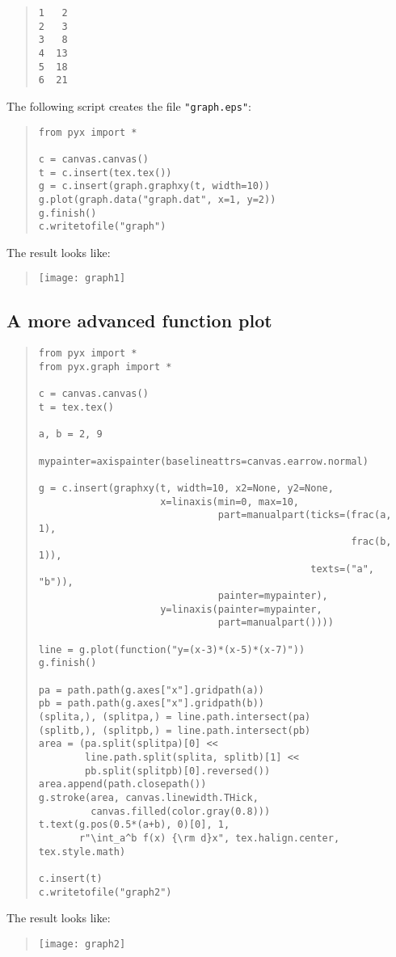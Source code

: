 \begin{quote}
\begin{verbatim}
1   2
2   3
3   8
4  13
5  18
6  21
\end{verbatim}
\end{quote}

The following script creates the file \verb|"graph.eps"|:

\begin{quote}
\begin{verbatim}
from pyx import *

c = canvas.canvas()
t = c.insert(tex.tex())
g = c.insert(graph.graphxy(t, width=10))
g.plot(graph.data("graph.dat", x=1, y=2))
g.finish()
c.writetofile("graph")
\end{verbatim}
\end{quote}

The result looks like:
\begin{quote}
\texttt{[image: graph1]}
\end{quote}

\subsection{A more advanced function plot}

\begin{quote}
\begin{verbatim}
from pyx import *
from pyx.graph import *

c = canvas.canvas()
t = tex.tex()

a, b = 2, 9

mypainter=axispainter(baselineattrs=canvas.earrow.normal)

g = c.insert(graphxy(t, width=10, x2=None, y2=None,
                     x=linaxis(min=0, max=10,
                               part=manualpart(ticks=(frac(a, 1),
                                                      frac(b, 1)),
                                               texts=("a", "b")),
                               painter=mypainter),
                     y=linaxis(painter=mypainter,
                               part=manualpart())))

line = g.plot(function("y=(x-3)*(x-5)*(x-7)"))
g.finish()

pa = path.path(g.axes["x"].gridpath(a))
pb = path.path(g.axes["x"].gridpath(b))
(splita,), (splitpa,) = line.path.intersect(pa)
(splitb,), (splitpb,) = line.path.intersect(pb)
area = (pa.split(splitpa)[0] <<
        line.path.split(splita, splitb)[1] <<
        pb.split(splitpb)[0].reversed())
area.append(path.closepath())
g.stroke(area, canvas.linewidth.THick,
         canvas.filled(color.gray(0.8)))
t.text(g.pos(0.5*(a+b), 0)[0], 1,
       r"\int_a^b f(x) {\rm d}x", tex.halign.center, tex.style.math)

c.insert(t)
c.writetofile("graph2")
\end{verbatim}
\end{quote}

The result looks like:
\begin{quote}
\texttt{[image: graph2]}
\end{quote}

